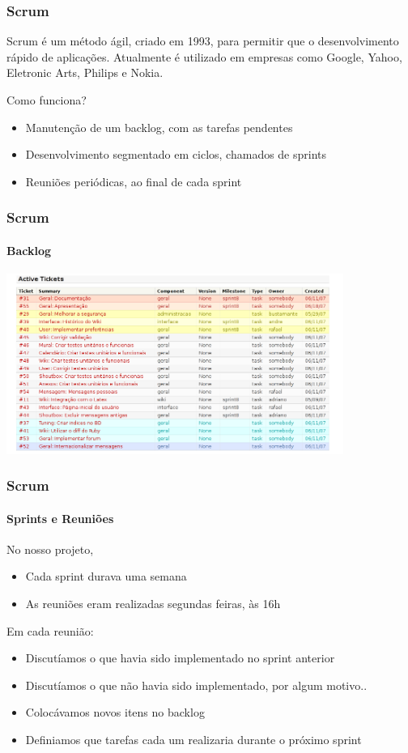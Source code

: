 \documentclass[11pt]{beamer}
\def\gap{\vspace{0.1in}}
\def\Gap{\vspace{0.25in}}
\begin{document}
	\begin{frame}
		\frametitle{Scrum}
		Scrum é um método ágil, criado em 1993, para permitir
		que o desenvolvimento rápido de aplicações. Atualmente é utilizado
		em empresas como Google, Yahoo, Eletronic Arts, Philips e Nokia.

		\Gap
		Como funciona?

		\begin{itemize}
			\item Manutenção de um \alert{backlog}, com as tarefas pendentes
			\item Desenvolvimento segmentado em ciclos, chamados de \alert{sprints}
			\item Reuniões periódicas, ao final de cada sprint
		\end{itemize}
	\end{frame}

	\begin{frame}
		\frametitle{Scrum}
		\framesubtitle{Backlog}
		\includegraphics[width=110mm]{backlog.png}
	\end{frame}
	\begin{frame}
		\frametitle{Scrum}
		\framesubtitle{Sprints e Reuniões}

		No nosso projeto,
		\begin{itemize}
			\item Cada sprint durava uma semana
			\item As reuniões eram realizadas segundas feiras, às 16h
		\end{itemize}

		\gap
		Em cada reunião:
		\begin{itemize}
			\item Discutíamos o que havia sido implementado no sprint anterior
			\item Discutíamos o que não havia sido implementado, por algum
			motivo..
			\item Colocávamos novos itens no backlog
			\item Definiamos que tarefas cada um realizaria durante o próximo
			sprint
		\end{itemize}
	\end{frame}
\end{document}
